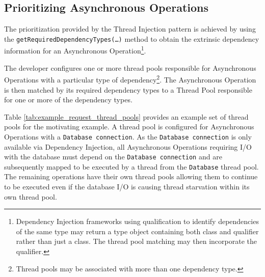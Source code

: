 \documentclass[prodmode]{style/acmlarge}
\begin{document}
\subsection{Prioritizing Asynchronous Operations}

The prioritization provided by the Thread Injection pattern is achieved by using
the \texttt{getRequiredDependencyTypes(\ldots)} method to obtain the extrinsic
dependency information for an Asynchronous Operation\footnote{Dependency
Injection frameworks using qualification to identify dependencies of the same
type may return a type object containing both class and qualifier rather than
just a class.  The thread pool matching may then incorporate the qualifier.}.

The developer configures one or more thread pools responsible for Asynchronous
Operations with a particular type of dependency\footnote{Thread pools may be
associated with more than one dependency type.}.  The Asynchronous Operation is
then matched by its required dependency types to a Thread Pool responsible for
one or more of the dependency types. 

Table \ref{tab:example_request_thread_pools} provides an example set of thread
pools for the motivating example.  A thread pool is configured for Asynchronous
Operations with a \texttt{Database connection}.  As the \texttt{Database
connection} is only available via Dependency Injection, all Asynchronous
Operations requiring I/O with the database must depend on the \texttt{Database
connection} and are subsequently mapped to be executed by a thread from the
\texttt{Database} thread pool.  The remaining operations have their own thread
pools allowing them to continue to be executed even if the database I/O is
causing thread starvation within its own thread pool.

\begin{table}[t]
\label{tab:example_request_thread_pools}
\end{table}
\end{document}
